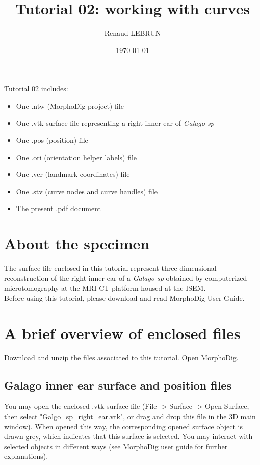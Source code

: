 \documentclass[12pt, a4paper]{book}
\title{Tutorial 02: working with curves}
\author{Renaud LEBRUN}
\affil{Institut des Sciences de l'Evolution, Université de Montpellier, France}
\date{\today}
\begin{document}
\dominitoc	

\maketitle

\faketableofcontents



\minitoc 
Tutorial 02 includes:
\begin{itemize}
\item One .ntw (MorphoDig project) file
\item One .vtk surface file representing a right inner ear of \textit{Galago sp}
\item One .pos (position) file 
\item One .ori (orientation helper labels) file 
\item One .ver (landmark coordinates) file
\item One .stv (curve nodes and curve handles) file
\item The present .pdf document
\end{itemize}





\section{About the specimen}

The surface file enclosed in this tutorial represent three-dimensional reconstruction of the right inner ear of a \textit{Galago sp} obtained by computerized microtomography at the MRI \si{\micro} CT platform housed at the ISEM.\\
Before using this tutorial, please download and read MorphoDig User Guide.


\section{A brief overview of enclosed files}
		Download and unzip the files associated to this tutorial. Open MorphoDig.
\subsection{Galago inner ear surface and position files}
	You may open the enclosed .vtk surface file (File -> Surface -> Open Surface, then select "Galgo\_sp\_right\_ear.vtk", or drag and drop this file in the 3D main window). When opened
this way, the corresponding opened surface object is drawn grey, which indicates that this surface
is selected. You may interact with selected objects in different ways (see MorphoDig user guide for
further explanations).\\
\end{document}
